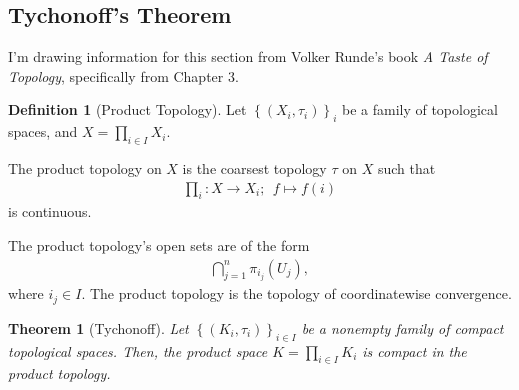 \documentclass[10pt]{extarticle}
\newcommand{\set}[1]{\left\{#1\right\}}
\theoremstyle{plain}
\newtheorem*{theorem}{Theorem}
\theoremstyle{definition}
\newtheorem*{definition}{Definition}
\theoremstyle{note}
\renewcommand{\newline}{\hfill\break}
\begin{document}
\subsection{Tychonoff's Theorem}%
I'm drawing information for this section from Volker Runde's book \textit{A Taste of Topology}, specifically from Chapter 3.
\begin{definition}[Product Topology]
  Let $\set{\left(X_{i},\tau_{i}\right)}_{i}$ be a family of topological spaces, and $\displaystyle X = \prod_{i\in I}X_i$.\newline

  The product topology on $X$ is the coarsest topology $\tau$ on $X$ such that
  \begin{align*}
    \prod_{i}: X \rightarrow X_i;~~f\mapsto f(i)
  \end{align*}
  is continuous.
\end{definition}
The product topology's open sets are of the form
\begin{align*}
  \bigcap_{j=1}^{n}\pi_{i_j}\left(U_j\right),
\end{align*}
where $i_{j}\in I$. The product topology is the topology of coordinatewise convergence.
\begin{theorem}[Tychonoff]
  Let $\set{\left(K_i,\tau_i\right)}_{i\in I}$ be a nonempty family of compact topological spaces. Then, the product space $\displaystyle K = \prod_{i\in I}K_i$ is compact in the product topology.
\end{theorem}
\end{document}
